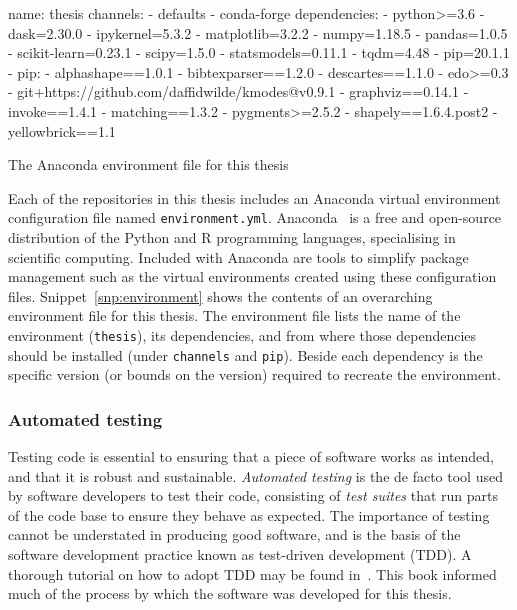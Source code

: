 \begin{listing}[htbp]
\begin{sourceyml}
name: thesis
channels:
- defaults
- conda-forge
dependencies:
 - python>=3.6
 - dask=2.30.0
 - ipykernel=5.3.2
 - matplotlib=3.2.2
 - numpy=1.18.5
 - pandas=1.0.5
 - scikit-learn=0.23.1
 - scipy=1.5.0
 - statsmodels=0.11.1
 - tqdm=4.48
 - pip=20.1.1
 - pip:
   - alphashape==1.0.1
   - bibtexparser==1.2.0
   - descartes==1.1.0
   - edo>=0.3
   - git+https://github.com/daffidwilde/kmodes@v0.9.1
   - graphviz==0.14.1
   - invoke==1.4.1
   - matching==1.3.2
   - pygments>=2.5.2
   - shapely==1.6.4.post2
   - yellowbrick==1.1
\end{sourceyml}
\caption{The Anaconda environment file for this thesis}\label{snp:environment}
\end{listing}

Each of the repositories in this thesis includes an Anaconda virtual environment
configuration file named \texttt{environment.yml}.
Anaconda~\cite{anaconda} is a free and open-source distribution of the Python
and R programming languages, specialising in scientific computing. Included with
Anaconda are tools to simplify package management such as the virtual
environments created using these configuration files.
Snippet~\ref{snp:environment} shows the contents of an overarching environment
file for this thesis. The environment file lists the name of the environment
(\texttt{thesis}), its dependencies, and from where those
dependencies should be installed (under \texttt{channels} and
\texttt{pip}). Beside each dependency is the specific version (or
bounds on the version) required to recreate the environment.

\subsubsection{Automated testing}

Testing code is essential to ensuring that a piece of software works as
intended, and that it is robust and sustainable. \emph{Automated testing} is the
de facto tool used by software developers to test their code, consisting of
\emph{test suites} that run parts of the code base to ensure they behave as
expected. The importance of testing cannot be understated in producing good
software, and is the basis of the software development practice known as
test-driven development (TDD). A thorough tutorial on how to adopt TDD may be
found in~\cite{Percival2017}. This book informed much of the process by which
the software was developed for this thesis. 

